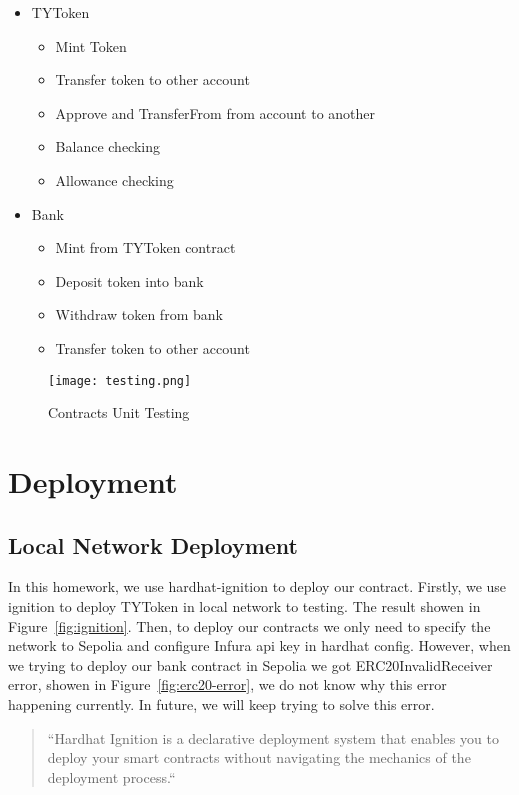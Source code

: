 \begin{itemize}
  \item TYToken
  \begin{itemize}
    \item Mint Token
    \item Transfer token to other account
    \item Approve and TransferFrom from account to another
    \item Balance checking
    \item Allowance checking
  \end{itemize}
  \item Bank
  \begin{itemize}
    \item Mint from TYToken contract
    \item Deposit token into bank
    \item Withdraw token from bank
    \item Transfer token to other account
  \end{itemize}
\end{itemize}

\begin{figure}[H]
    \centering
    \texttt{[image: testing.png]}
    \caption{Contracts Unit Testing}
    \label{fig:testing}
\end{figure}

\section{Deployment}

\subsection{Local Network Deployment}

In this homework, we use hardhat-ignition to deploy our contract. Firstly, we
use ignition to deploy TYToken in local network to testing. The result showen
in Figure~\ref{fig:ignition}. Then, to deploy our contracts we only need to
specify the network to Sepolia and configure Infura api key in hardhat config.
However, when we trying to deploy our bank contract in Sepolia we got
ERC20InvalidReceiver error, showen in Figure~\ref{fig:erc20-error}, we do not
know why this error happening currently. In future, we will keep trying to
solve this error.

\begin{quote}
``Hardhat Ignition is a declarative deployment system that enables you to
deploy your smart contracts without navigating the mechanics of the deployment
process.``
\end{quote}
 
